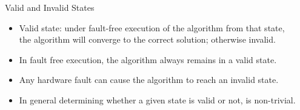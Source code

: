 \begin{columns}
\begin{column}{0.5\textwidth}
{}
\end{column}
\begin{column}{0.5\textwidth}
\begin{block}{Valid and Invalid States}

\begin{itemize}
\item Valid state: under fault-free execution of the algorithm from that state, the algorithm will converge to the correct solution; otherwise invalid. 
\item In fault free execution, the algorithm always remains in a valid state.
\item Any hardware fault can cause the algorithm to reach an invalid state.
\item In general determining whether a given state is valid or not, is non-trivial.     
\end{itemize}
\end{block}
\end{column}
\end{columns}


